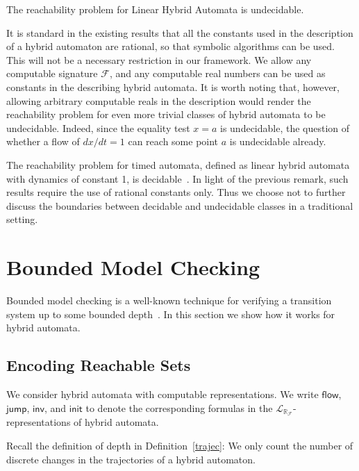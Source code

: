 \documentclass[envcountsect]{llncs}
\newcommand{\flow}{\mathsf{flow}}
\newcommand{\jump}{\mathsf{jump}}
\newcommand{\inv}{\mathsf{inv}}
\newcommand{\init}{\mathsf{init}}
\newcommand{\lrf}{\mathcal{L}_{\mathbb{R}_{\mathcal{F}}}}
\begin{document}
\begin{proposition}
The reachability problem for Linear Hybrid Automata is undecidable. 
\end{proposition}

It is standard in the existing results that all the constants used in the 
description of a hybrid automaton are rational, so that symbolic algorithms can
be used. This will not be a necessary restriction in our framework. We allow any
computable signature $\mathcal{F}$, and any computable real numbers can be used
as constants in the describing hybrid automata. It is worth noting that,
however, allowing arbitrary computable reals in the description would render the
reachability problem for even more trivial classes of hybrid automata to be
undecidable. Indeed, since the equality test $x=a$ is undecidable, the question
of whether a flow of $dx/dt = 1$ can reach some point $a$ is undecidable
already.

\begin{remark}
The reachability problem for timed automata, defined as linear hybrid automata 
with dynamics of constant 1, is decidable~\cite{DBLP:conf/rex/AlurD91}. In light
of the previous remark, such results require the use of rational constants only.
Thus we choose not to further discuss the boundaries between decidable and
undecidable classes in a traditional setting. 
\end{remark}


\section{Bounded Model Checking}


Bounded model checking is a well-known technique for verifying a transition 
system up to some bounded depth~\cite{DBLP:journals/fmsd/ClarkeBRZ01}. In this
section we show how it works for hybrid automata. 



\subsection{Encoding Reachable Sets}

We consider hybrid automata with computable representations.  We write $\flow$,
$\jump$, $\inv$, and $\init$ to denote the corresponding formulas in the
$\lrf$-representations of hybrid automata. 

\begin{remark}
Recall the definition of depth in Definition~\ref{trajec}: We only count the
number of discrete changes in the trajectories of a hybrid automaton. 
\end{remark}
\end{document}
